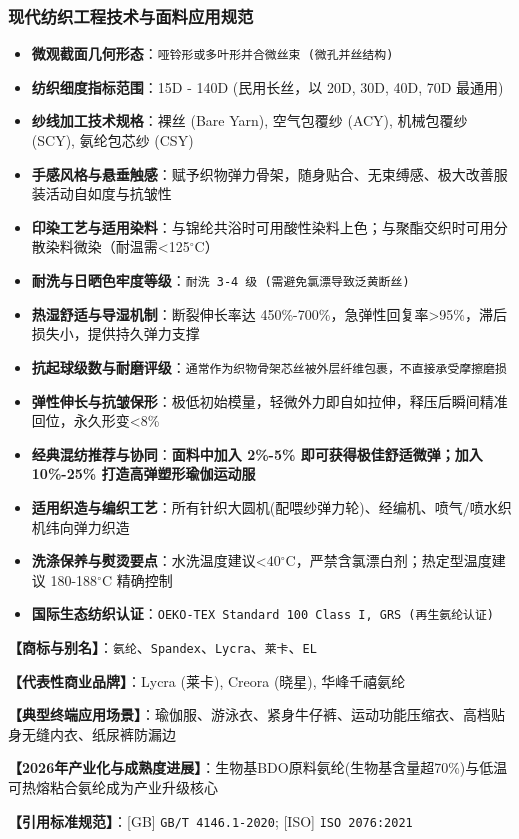 \documentclass[11pt,openright,twoside,UTF8]{ctexbook}
\begin{document}
\subsubsection*{现代纺织工程技术与面料应用规范}
\begin{itemize} \setlength{\itemsep}{2pt}
    \item \textbf{微观截面几何形态}：\texttt{哑铃形或多叶形并合微丝束 (微孔并丝结构)}
    \item \textbf{纺织细度指标范围}：15D - 140D (民用长丝，以 20D, 30D, 40D, 70D 最通用)
    \item \textbf{纱线加工技术规格}：裸丝 (Bare Yarn), 空气包覆纱 (ACY), 机械包覆纱 (SCY), 氨纶包芯纱 (CSY)
    \item \textbf{手感风格与悬垂触感}：赋予织物弹力骨架，随身贴合、无束缚感、极大改善服装活动自如度与抗皱性
    \item \textbf{印染工艺与适用染料}：与锦纶共浴时可用酸性染料上色；与聚酯交织时可用分散染料微染（耐温需\textless{}125$^\circ\mathrm{C}$）
    \item \textbf{耐洗与日晒色牢度等级}：\texttt{耐洗 3-4 级 (需避免氯漂导致泛黄断丝)}
    \item \textbf{热湿舒适与导湿机制}：断裂伸长率达 450\%-700\%，急弹性回复率\textgreater{}95\%，滞后损失小，提供持久弹力支撑
    \item \textbf{抗起球级数与耐磨评级}：\texttt{通常作为织物骨架芯丝被外层纤维包裹，不直接承受摩擦磨损}
    \item \textbf{弹性伸长与抗皱保形}：极低初始模量，轻微外力即自如拉伸，释压后瞬间精准回位，永久形变\textless{}8\%
    \item \textbf{经典混纺推荐与协同}：\textbf{面料中加入 2\%-5\% 即可获得极佳舒适微弹；加入 10\%-25\% 打造高弹塑形瑜伽运动服}
    \item \textbf{适用织造与编织工艺}：所有针织大圆机(配喂纱弹力轮)、经编机、喷气/喷水织机纬向弹力织造
    \item \textbf{洗涤保养与熨烫要点}：水洗温度建议\textless{}40$^\circ\mathrm{C}$，严禁含氯漂白剂；热定型温度建议 180-188$^\circ\mathrm{C}$ 精确控制
    \item \textbf{国际生态纺织认证}：\texttt{OEKO-TEX Standard 100 Class I, GRS (再生氨纶认证)}
\end{itemize}
\vspace{0.2cm}

\noindent\textbf{【商标与别名】}：\texttt{氨纶}、\texttt{Spandex}、\texttt{Lycra}、\texttt{莱卡}、\texttt{EL}\par
\noindent\textbf{【代表性商业品牌】}：Lycra (莱卡), Creora (晓星), 华峰千禧氨纶\par
\noindent\textbf{【典型终端应用场景】}：瑜伽服、游泳衣、紧身牛仔裤、运动功能压缩衣、高档贴身无缝内衣、纸尿裤防漏边\par
\noindent\textbf{【2026年产业化与成熟度进展】}：生物基BDO原料氨纶(生物基含量超70\%)与低温可热熔粘合氨纶成为产业升级核心\par
\noindent\textbf{【引用标准规范】}：[GB] \texttt{GB/T 4146.1-2020}; [ISO] \texttt{ISO 2076:2021}\par
\vspace{0.5cm}
\end{document}
